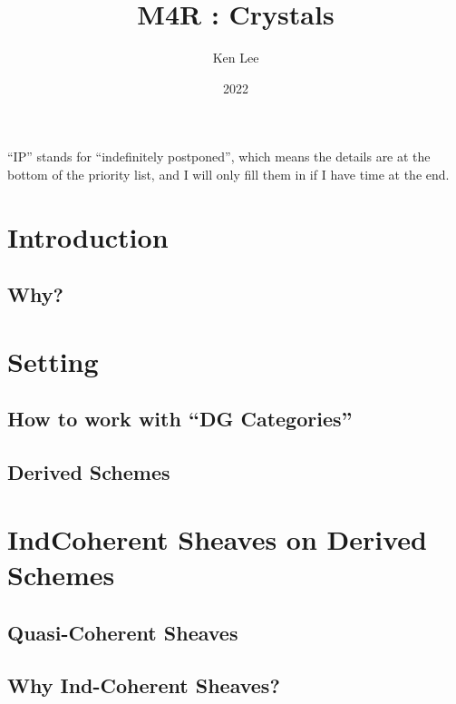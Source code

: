 \documentclass{article}
\begin{document}
\title{M4R : Crystals }

\author{Ken Lee}
\date{2022}
\maketitle

\tableofcontents

``IP'' stands for ``indefinitely postponed'', 
which means the details are at the bottom of the priority list,
and I will only fill them in if I have time at the end.

\section{Introduction}

  \subsection{Why?}

\section{Setting}

  \subsection{How to work with ``DG Categories''}

  \subsection{Derived Schemes}

\section{IndCoherent Sheaves on Derived Schemes}

  \subsection{Quasi-Coherent Sheaves}

  \subsection{Why Ind-Coherent Sheaves?}
\end{document}
